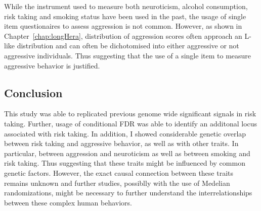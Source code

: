 While the instrument used to measure both neuroticism, alcohol consumption, risk taking and smoking status have been used in the past, the usage of single item questionaires to assess aggression is not common.
However, as shown in Chapter~\ref{chap:longHera}, distribution of aggression scores often approach an L-like distribution and can often be dichotomised into either aggressive or not aggressive individuals.
Thus suggesting that the use of a single item to measure aggressive behavior is justified.

\subsection{Conclusion}
\label{sub:conclusion}

This study was able to replicated previous genome wide significant signals in risk taking.
Further, usage of conditional FDR was able to identify an additonal locus associated with risk taking.
In addition, I showed considerable genetic overlap between risk taking and aggressive behavior, as well as with other traits.
In particular, between aggression and neuroticism as well as between smoking and risk taking.
Thus suggesting that these traits might be influenced by common genetic factors.
However, the exact causal connection between these traits remains unknown and further studies, possiblly with the use of Medelian randomizations, might be necessary to further understand the interrelationships between these complex human behaviors. 
